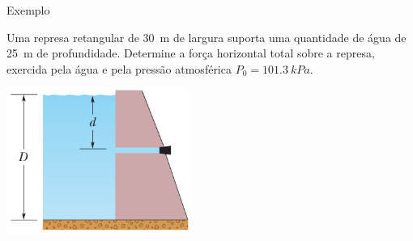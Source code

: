 \begin{frame}{Exemplo}
    \begin{minipage}{\textwidth}
        Uma represa retangular de \SI{30}{m} de largura suporta uma quantidade de água de \SI{25}{m} de profundidade. Determine a força horizontal total sobre a represa, exercida pela água e pela pressão atmosférica $P_0 = \SI{101.3}{kPa}$.
    \end{minipage}
    \begin{center}
        \includegraphics[width=0.45\textwidth]{images/represa}
    \end{center}
\end{frame}
